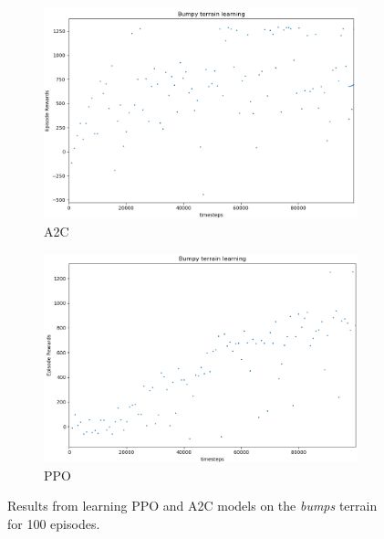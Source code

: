 \documentclass{article}
\begin{document}
\begin{figure}[ht]
\begin{subfigure}{.5\textwidth}
  \centering
  \includegraphics[width=.95\linewidth]{figc/Bumpy_terrain_learning_100ep_a2c.png}  
  \caption{A2C}
  \label{fig:sub-first}
\end{subfigure}
\begin{subfigure}{.5\textwidth}
  \centering
  \includegraphics[width=.95\linewidth]{figc/Bumpy_terrain_learning_100ep_ppo.png}  
  \caption{PPO}
  \label{fig:sub-second}
\end{subfigure}
  \caption{Results from learning PPO and A2C models on the \textit{bumps} terrain for 100 episodes.}
\label{fig:bumps}
\end{figure}
\end{document}
